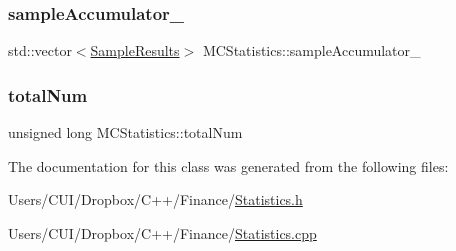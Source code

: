 \subsubsection{\texorpdfstring{sample\+Accumulator\+\_\+}{sampleAccumulator\_}}
{\footnotesize\ttfamily std\+::vector$<$\hyperlink{class_m_c_statistics_1_1_sample_results}{Sample\+Results}$>$ M\+C\+Statistics\+::sample\+Accumulator\+\_\+\hspace{0.3cm}{\ttfamily [private]}}

\hypertarget{class_m_c_statistics_ada9be8c85593b98c76b8b61252db97e2}{}\label{class_m_c_statistics_ada9be8c85593b98c76b8b61252db97e2} 
\subsubsection{\texorpdfstring{total\+Num}{totalNum}}
{\footnotesize\ttfamily unsigned long M\+C\+Statistics\+::total\+Num\hspace{0.3cm}{\ttfamily [private]}}



The documentation for this class was generated from the following files\+:\begin{DoxyCompactItemize}
\item 
Users/\+C\+U\+I/\+Dropbox/\+C++/\+Finance/\hyperlink{_statistics_8h}{Statistics.\+h}\item 
Users/\+C\+U\+I/\+Dropbox/\+C++/\+Finance/\hyperlink{_statistics_8cpp}{Statistics.\+cpp}\end{DoxyCompactItemize}
